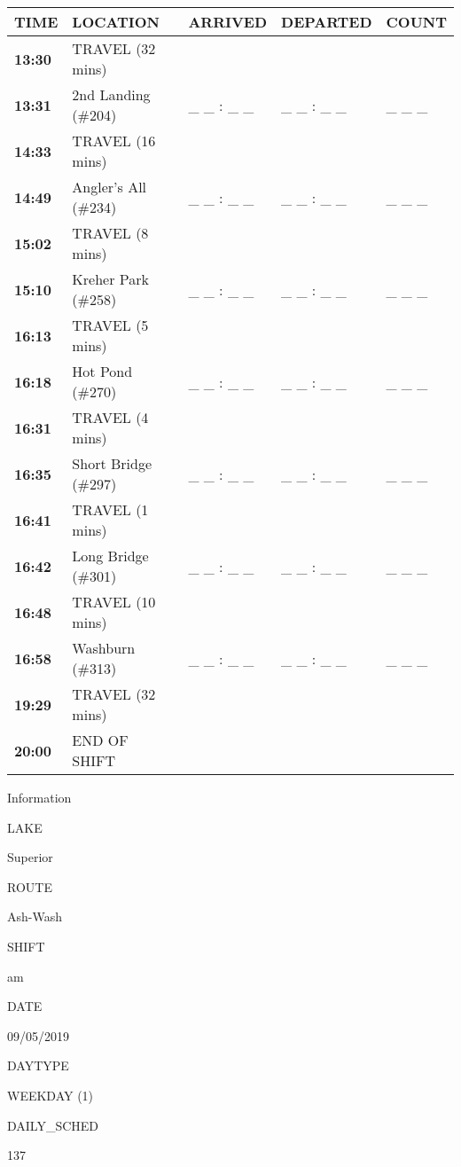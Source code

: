 \documentclass[]{article}
\begin{document}
\begin{tabular}{>{\bfseries}lllll}
\toprule
\textbf{TIME} & \textbf{LOCATION} & \textbf{ARRIVED} & \textbf{DEPARTED} & \textbf{COUNT}\\
\midrule
13:30 & TRAVEL (32 mins) &  &  & \\
13:31 & 2nd Landing (\#204) & \_ \_ : \_ \_ & \_ \_ : \_ \_ & \_ \_ \_\\
14:33 & TRAVEL (16 mins) &  &  & \\
14:49 & Angler's All (\#234) & \_ \_ : \_ \_ & \_ \_ : \_ \_ & \_ \_ \_\\
15:02 & TRAVEL (8 mins) &  &  & \\
15:10 & Kreher Park (\#258) & \_ \_ : \_ \_ & \_ \_ : \_ \_ & \_ \_ \_\\
16:13 & TRAVEL (5 mins) &  &  & \\
16:18 & Hot Pond (\#270) & \_ \_ : \_ \_ & \_ \_ : \_ \_ & \_ \_ \_\\
16:31 & TRAVEL (4 mins) &  &  & \\
16:35 & Short Bridge (\#297) & \_ \_ : \_ \_ & \_ \_ : \_ \_ & \_ \_ \_\\
16:41 & TRAVEL (1 mins) &  &  & \\
16:42 & Long Bridge (\#301) & \_ \_ : \_ \_ & \_ \_ : \_ \_ & \_ \_ \_\\
16:48 & TRAVEL (10 mins) &  &  & \\
16:58 & Washburn (\#313) & \_ \_ : \_ \_ & \_ \_ : \_ \_ & \_ \_ \_\\
19:29 & TRAVEL (32 mins) &  &  & \\
20:00 & END OF SHIFT &  &  & \\
\bottomrule
\end{tabular}\newpage

Information

LAKE

Superior

ROUTE

Ash-Wash

SHIFT

am

DATE

09/05/2019

DAYTYPE

WEEKDAY (1)

DAILY\_SCHED

137

\vspace{24pt}
\end{document}

